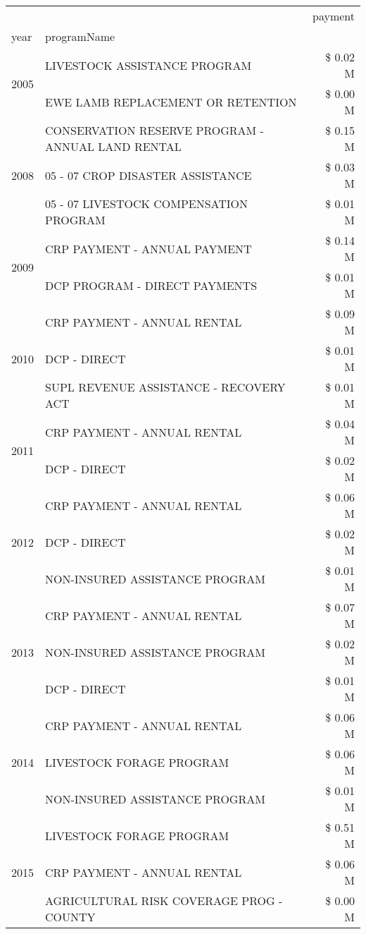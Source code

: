 \begin{tabular}{llr}
\toprule
 &  & payment \\
year & programName &  \\
\midrule
\multirow[t]{2}{*}{2005} & LIVESTOCK ASSISTANCE PROGRAM & \$ 0.02 M \\
 & EWE LAMB REPLACEMENT OR RETENTION & \$ 0.00 M \\
\cline{1-3}
\multirow[t]{3}{*}{2008} & CONSERVATION RESERVE PROGRAM - ANNUAL LAND RENTAL & \$ 0.15 M \\
 & 05 - 07 CROP DISASTER ASSISTANCE & \$ 0.03 M \\
 & 05 - 07 LIVESTOCK COMPENSATION PROGRAM & \$ 0.01 M \\
\cline{1-3}
\multirow[t]{2}{*}{2009} & CRP PAYMENT - ANNUAL PAYMENT & \$ 0.14 M \\
 & DCP PROGRAM - DIRECT PAYMENTS & \$ 0.01 M \\
\cline{1-3}
\multirow[t]{3}{*}{2010} & CRP PAYMENT - ANNUAL RENTAL & \$ 0.09 M \\
 & DCP - DIRECT & \$ 0.01 M \\
 & SUPL REVENUE ASSISTANCE - RECOVERY ACT & \$ 0.01 M \\
\cline{1-3}
\multirow[t]{2}{*}{2011} & CRP PAYMENT - ANNUAL RENTAL & \$ 0.04 M \\
 & DCP - DIRECT & \$ 0.02 M \\
\cline{1-3}
\multirow[t]{3}{*}{2012} & CRP PAYMENT - ANNUAL RENTAL & \$ 0.06 M \\
 & DCP - DIRECT & \$ 0.02 M \\
 & NON-INSURED ASSISTANCE PROGRAM & \$ 0.01 M \\
\cline{1-3}
\multirow[t]{3}{*}{2013} & CRP PAYMENT - ANNUAL RENTAL & \$ 0.07 M \\
 & NON-INSURED ASSISTANCE PROGRAM & \$ 0.02 M \\
 & DCP - DIRECT & \$ 0.01 M \\
\cline{1-3}
\multirow[t]{3}{*}{2014} & CRP PAYMENT - ANNUAL RENTAL & \$ 0.06 M \\
 & LIVESTOCK FORAGE PROGRAM & \$ 0.06 M \\
 & NON-INSURED ASSISTANCE PROGRAM & \$ 0.01 M \\
\cline{1-3}
\multirow[t]{3}{*}{2015} & LIVESTOCK FORAGE PROGRAM & \$ 0.51 M \\
 & CRP PAYMENT - ANNUAL RENTAL & \$ 0.06 M \\
 & AGRICULTURAL RISK COVERAGE PROG - COUNTY & \$ 0.00 M \\
\cline{1-3}

\end{tabular}
